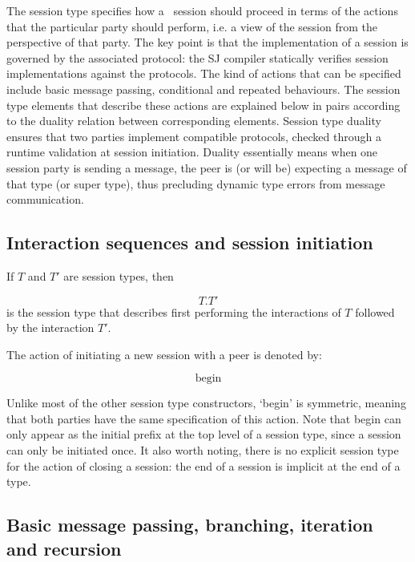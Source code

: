 The session type specifies how a ~session should proceed in terms of the actions that the particular party should perform, i.e. a view of the session from the perspective of that party. The key point is that the implementation of a session is governed by the associated protocol: the SJ compiler statically verifies session implementations against the protocols. The kind of actions that can be specified include basic message passing, conditional and repeated behaviours. The session type elements that describe these actions are explained below in pairs according to the duality relation between corresponding elements. Session type duality ensures that two parties implement compatible protocols, checked through a runtime validation at session initiation. Duality essentially means when one session party is sending a message, the peer is (or will be) expecting a message of that type (or super type), thus precluding dynamic type errors from message communication.

\subsection{Interaction sequences and session initiation}

If $T$ and $T'$ are session types, then

\begin{equation*}
T.T'
\end{equation*}
is the session type that describes first performing the interactions of $T$ followed by the interaction $T'$.

The action of initiating a new session with a peer is denoted by:

\begin{equation*}
\text{begin}
\end{equation*}

Unlike most of the other session type constructors, `begin' is symmetric, meaning that both parties have the same specification of this action. Note that begin can only appear as the initial prefix at the top level of a session type, since a session can only be initiated once. It also worth noting, there is no explicit session type for the action of closing a session: the end of a session is implicit at the end of a type.

\subsection{Basic message passing, branching, iteration and recursion}

